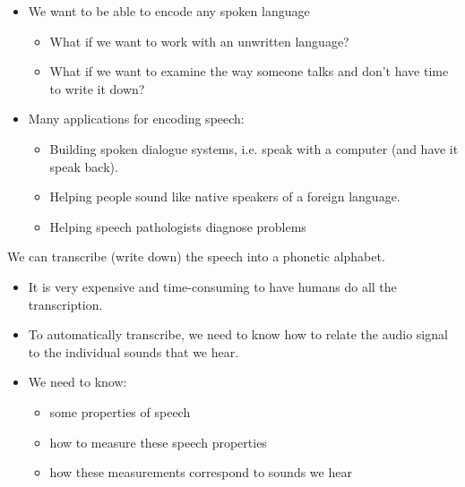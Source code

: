 \documentclass[a4paper,landscape,headrule,footrule,xetex]{foils}
\begin{document}
\begin{itemize}
\item We want to be able to encode any spoken language
  \begin{itemize}
  \item What if we want to work with an unwritten language?
  \item What if we want to examine the way someone talks and don't have time to write it down?
  \end{itemize}
\item Many applications for encoding speech:
  \begin{itemize}
  \item Building spoken dialogue systems, i.e. speak with a computer (and have it speak back).
  \item Helping people sound like native speakers of a foreign language.
  \item Helping speech pathologists diagnose problems
  \end{itemize}
\end{itemize}










We can transcribe (write down) the speech into a phonetic alphabet. 
\begin{itemize}
\item It is very expensive and time-consuming to have humans do all the transcription.
\item To automatically transcribe, we need to know how to relate the
  audio signal to the individual sounds that we hear.
\item  We need to know:
\begin{itemize}
\item some properties of speech
\item how to measure these speech properties
\item how these measurements correspond to sounds we hear
\end{itemize}
\end{itemize}
\end{document}
